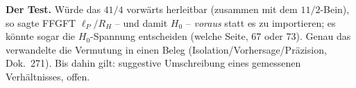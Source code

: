 \textbf{Der Test.} Würde das $41/4$ vorwärts herleitbar (zusammen mit dem
$11/2$-Bein), so sagte FFGFT $\ell_P/R_H$ -- und damit $H_0$ --
\emph{voraus} statt es zu importieren; es könnte sogar die $H_0$-Spannung
entscheiden (welche Seite, 67 oder 73). Genau das verwandelte die Vermutung in
einen Beleg (Isolation/Vorhersage/Präzision, Dok.~271). Bis dahin gilt:
suggestive Umschreibung eines gemessenen Verhältnisses, offen.
